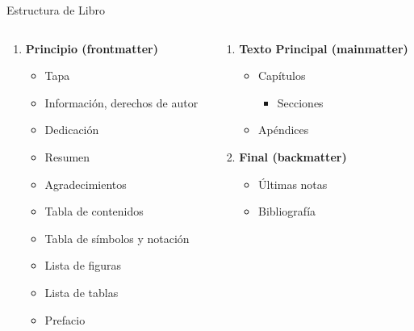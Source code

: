 \documentclass[11pt]{beamer}
\newcounter{savedenum}
\newcommand*{\saveenum}{\setcounter{savedenum}{\theenumi}}
\newcommand*{\resume}{\setcounter{enumi}{\thesavedenum}}
\begin{document}
\begin{frame}{Estructura de Libro}
\begin{columns}[t]
\begin{column}{0.5\textwidth}
  \begin{enumerate}
    \item \textbf{Principio (frontmatter)}
      \begin{itemize}
        \item Tapa
        \item Información, derechos de autor
        \item Dedicación
        \item Resumen
        \item Agradecimientos
        \item Tabla de contenidos
        \item Tabla de símbolos y notación
        \item Lista de figuras
        \item Lista de tablas
        \item Prefacio
      \end{itemize}
    \saveenum
  \end{enumerate}
\end{column}

\begin{column}{0.5\textwidth}
  \begin{enumerate}
    \resume
    \item \textbf{Texto Principal (mainmatter)}
      \begin{itemize}
        \item Capítulos
        \begin{itemize}
          \item Secciones
        \end{itemize}
        \item Apéndices
      \end{itemize}
      
    \item \textbf{Final (backmatter)}
      \begin{itemize}
        \item Últimas notas
        \item Bibliografía
      \end{itemize}
  \end{enumerate}
\end{column}
\end{columns}
\end{frame}
\end{document}
